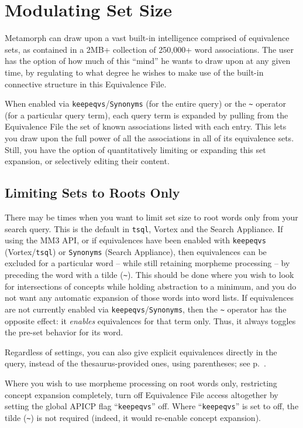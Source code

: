 \section{Modulating Set Size}

Metamorph can draw upon a vast built-in intelligence comprised of
equivalence sets, as contained in a 2MB+ collection of 250,000+ word
associations.  The user has the option of how much of this ``mind'' he
wants to draw upon at any given time, by regulating to what degree he
wishes to make use of the built-in connective structure in this
Equivalence File.

When enabled via \verb`keepeqvs`/\verb`Synonyms` (for the entire
query) or the \verb`~` operator (for a particular query term), each
query term is expanded by pulling from the Equivalence File the set of
known associations listed with each entry.  This lets you draw upon
the full power of all the associations in all of its equivalence sets.
Still, you have the option of quantitatively limiting or expanding
this set expansion, or selectively editing their content.

\subsection{Limiting Sets to Roots Only}

There may be times when you want to limit set size to root words only
from your search query.  This is the default in \verb`tsql`, Vortex
and the Search Appliance.  If using the MM3 API, or if equivalences
have been enabled with \verb`keepeqvs` (Vortex/\verb`tsql`) or
\verb`Synonyms` (Search Appliance), then equivalences can be excluded
for a particular word -- while still retaining morpheme processing -- by
preceding the word with a tilde (\verb`~`).  This should be done where
you wish to look for intersections of concepts while holding
abstraction to a minimum, and you do not want any automatic expansion
of those words into word lists.  If equivalences are not currently
enabled via \verb`keepeqvs`/\verb`Synonyms`, then the \verb`~` operator
has the opposite effect: it {\em enables} equivalences for that term
only.  Thus, it always toggles the pre-set behavior for its word.

  Regardless of settings, you can also give explicit equivalences
directly in the query, instead of the thesaurus-provided ones, using
parentheses; see p.~\pageref{`MetamorphParenSet'}.

Where you wish to use morpheme processing on root words only,
restricting concept expansion completely, turn off Equivalence File
access altogether by setting the global APICP flag ``\verb`keepeqvs`''
off.  Where ``\verb`keepeqvs`'' is set to off, the tilde (\verb`~`) is
not required (indeed, it would re-enable concept expansion).

